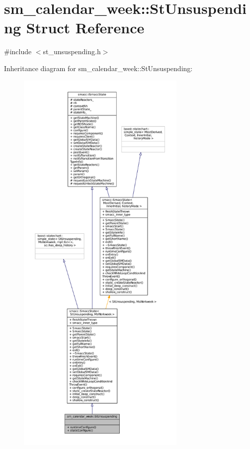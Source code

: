 \hypertarget{structsm__calendar__week_1_1StUnsuspending}{}\section{sm\+\_\+calendar\+\_\+week\+:\+:St\+Unsuspending Struct Reference}
\label{structsm__calendar__week_1_1StUnsuspending}


{\ttfamily \#include $<$st\+\_\+unsuspending.\+h$>$}



Inheritance diagram for sm\+\_\+calendar\+\_\+week\+:\+:St\+Unsuspending\+:
\nopagebreak
\begin{figure}[H]
\begin{center}
\leavevmode
\includegraphics[height=550pt]{structsm__calendar__week_1_1StUnsuspending__inherit__graph}
\end{center}
\end{figure}


